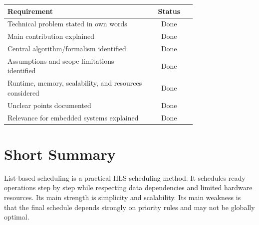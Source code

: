 \documentclass[11pt,a4paper]{article}
\begin{document}
\begin{table}[h]
\centering
\begin{tabular}{p{0.75\linewidth}c}
\toprule
Requirement & Status \\
\midrule
Technical problem stated in own words & Done \\
Main contribution explained & Done \\
Central algorithm/formalism identified & Done \\
Assumptions and scope limitations identified & Done \\
Runtime, memory, scalability, and resources considered & Done \\
Unclear points documented & Done \\
Relevance for embedded systems explained & Done \\
\bottomrule
\end{tabular}
\end{table}

\section*{Short Summary}

List-based scheduling is a practical HLS scheduling method. It schedules ready operations step by step while respecting data dependencies and limited hardware resources. Its main strength is simplicity and scalability. Its main weakness is that the final schedule depends strongly on priority rules and may not be globally optimal.



\end{document}
